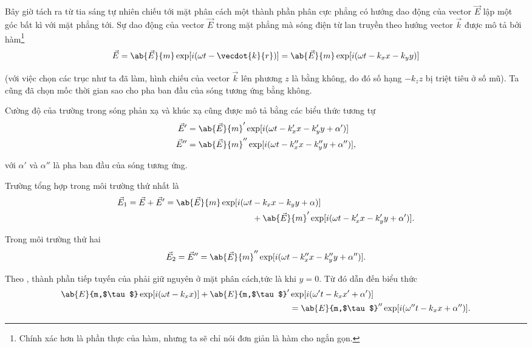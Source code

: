 Bây giờ tách ra từ tia sáng tự nhiên chiếu tới mặt phân cách một thành phần phân cực phẳng có hướng dao động của vector $\vec{E}$ lập một góc bất kì với mặt phẳng tới.
Sự dao động của vector $\vec{E}$ trong mặt phẳng mà sóng điện từ lan truyền theo hướng vector $\vec{k}$ được mô tả bởi hàm\footnote{Chính xác hơn là phần thực của hàm, nhưng ta sẽ chỉ nói đơn giản là hàm cho ngắn gọn.}
\begin{equation*}
    \vec{E} = \ab{\vec{E}}{m} \exp[i (\omega t - \vecdot{k}{r})] = \ab{\vec{E}}{m} \exp[i (\omega t - k_x x - k_y y)]
\end{equation*}

\noindent
(với việc chọn các trục như ta đã làm, hình chiếu của vector $\vec{k}$ lên phương $z$ là bằng không, do đó số hạng $-k_zz$ bị triệt tiêu ở số mũ).
Ta cũng đã chọn mốc thời gian sao cho pha ban đầu của sóng tương ứng bằng không.

Cường độ của trường trong sóng phản xạ và khúc xạ cũng được mô tả bằng các biểu thức tương tự
\begin{align*}
    \vec{E}' &= \ab{\vec{E}}{m}' \exp[i (\omega t - k_x' x - k_y' y + \alpha')]\\
    \vec{E}'' &= \ab{\vec{E}}{m}'' \exp[i (\omega t - k_x'' x - k_y'' y + \alpha'')],
\end{align*}

\noindent
với $\alpha'$ và $\alpha''$ là pha ban đầu của sóng tương ứng.

Trường tổng hợp trong môi trường thứ nhất là
\begin{align}
    \vec{E}_1 = \vec{E} + \vec{E}' = \ab{\vec{E}}{m} \exp[i (\omega t &- k_x x - k_y y + \alpha)] \nonumber\\
    &+ \ab{\vec{E}}{m}' \exp[i (\omega t - k_x' x - k_y' y + \alpha')].\label{eq:16_18}
\end{align}

\noindent
Trong môi trường thứ hai
\begin{equation}\label{eq:16_19}
    \vec{E}_2 = \vec{E}'' = \ab{\vec{E}}{m}'' \exp[i (\omega t - k_x'' x - k_y'' y + \alpha'')].
\end{equation}

\noindent
Theo , thành phần tiếp tuyến của  phải giữ nguyên ở mặt phân cách,tức là khi $y = 0$.
Từ đó dẫn đến biểu thức
\begin{align}
    \ab{E}{m,$\tau$} \exp[i(\omega t - k_xx)] + \ab{E}{m,$\tau$}' &\exp[i(\omega' t - k_xx' + \alpha')] \nonumber\\
    &= \ab{E}{m,$\tau$}'' \exp[i(\omega'' t - k_xx + \alpha'')].\label{eq:16_20}
\end{align}

